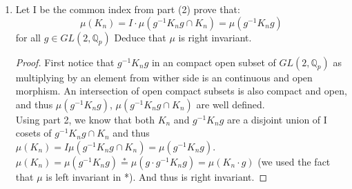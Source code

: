 \documentclass[12pt]{article}
\theoremstyle{definition}
\theoremstyle{lemma}
\theoremstyle{conclusion}
\def\qp{\mathbb{Q}_{p}}
\def\gl#1{GL(2, #1)}
\def\glqp{\gl{\qp}}
\numberwithin{equation}{section}
\begin{document}
\begin{enumerate}
\begin{proof}
\\ Using those observations:
\\ $[K_n:g^{-1}K_ng \cap K_n]\stackrel{\psi}{=}[K_n:\delta^{-1}K_n\delta \cap K_n] \stackrel{1}{=}  [\delta^{-1}K_n\delta:\delta^{-1}K_n\delta \cap K_n] \stackrel{\psi^{-1}}{=} [g^{-1}K_n g :g^{-1}K_n g \cap K_n]$
\end{proof}
\item Let I be the common index from part (2) prove that:
$$ \mu(K_n) = I \cdot \mu(g^{-1}K_ng \cap K_n)= \mu(g^{-1}K_ng)$$ for all $g \in \glqp$ Deduce that $\mu$ is right invariant.
\begin{proof}
First notice that $g^{-1}K_ng$ in an compact open subset of $\glqp$ as multiplying by an element from wither side is an continuous and open morphism. An intersection of open compact subsets is also compact and open, and thus $\mu(g^{-1} K_n g)$, $\mu(g^{-1} K_n g \cap K_n)$ are well defined.
\\ Using part 2, we know that both $K_n$ and $g^{-1} K_n g$  are a disjoint union of  I cosets of $ g^{-1} K_n g \cap K_n$ and thus $\mu(K_n) = I \mu( g^{-1} K_n g \cap K_n) = \mu( g^{-1} K_n g)$.
\\$\mu(K_n) = \mu(  g^{-1} K_n g) \stackrel{*}{=} \mu(g \cdot  g^{-1} K_n g) = \mu(K_n \cdot g)$ (we used the fact that $\mu$ is left invariant in *). And thus is right invariant.
\end{proof}
\end{enumerate}
\end{document}
